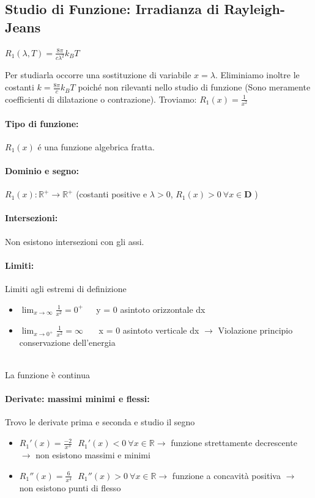 \documentclass{article}
\begin{document}
\subsection{Studio di Funzione: Irradianza di Rayleigh-Jeans}
\begin{center}
$R_1(\lambda, T) = \frac{8\pi}{c \lambda ^2} k_B T$ 
\end{center}
Per studiarla occorre una sostituzione di variabile $x = \lambda $.  Eliminiamo inoltre le costanti $k = \frac{8\pi}{c} k_B T$ poiché non rilevanti nello studio di funzione (Sono meramente coefficienti di dilatazione o contrazione). Troviamo: $R_1(x) = \frac{1}{x^2}$
\vspace*{-0.10in}
\paragraph{Tipo di funzione:} $R_1(x)$ é una funzione algebrica fratta.
\vspace*{-0.10in}
\paragraph{Dominio e segno:} $R_1(x) :\mathbb{R}^+ \to \mathbb{R}^+$ (costanti positive e $\lambda>0$, $R_1(x)>0 \ \forall x \in \textbf{D} $ )
\vspace*{-0.10in}
\paragraph{Intersezioni:} Non esistono intersezioni con gli assi. 
\vspace*{-0.10in}
\paragraph{Limiti:} Limiti agli estremi di definizione
\begin{itemize}
\item $\lim_{x \to \infty } \frac{1}{x^2} = 0^+ $\ \ \  y = 0 asintoto orizzontale dx 
\item $\lim_{x \to 0^+} \frac{1}{x^2}  = \infty $ \ \ \ x = 0 asintoto verticale dx $\to$ Violazione principio conservazione dell'energia
\end{itemize}
\\ La funzione è continua
\vspace*{-0.10in}
\paragraph{Derivate: massimi minimi e flessi:} Trovo le derivate prima e seconda e studio il segno
\begin{itemize}
    \item $R_1'(x) = \frac{-2}{x^3} \ \ \ R_1'(x)<0 \  \forall x \in \mathbb{R} \to$ funzione strettamente decrescente $\to$ non esistono massimi e minimi 
    \item $R_1''(x) = \frac{6}{x^4} \ \ \ R_1''(x)>0  \ \forall x \in \mathbb{R} \to$ funzione a concavità positiva $\to$ non esistono punti di flesso
\end{itemize}
\end{document}
